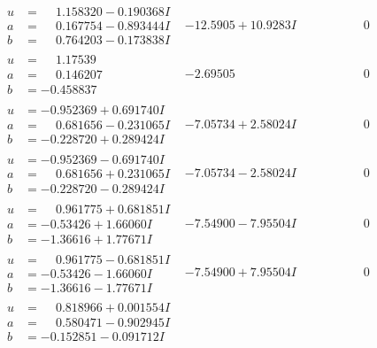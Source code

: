 \documentclass[1p]{elsarticle_modified}
\theoremstyle{definition}
\begin{document}
$$\begin{array}{c|c|c}
\begin{aligned}
u &= \phantom{-}1.158320 - 0.190368 I \\
a &= \phantom{-}0.167754 - 0.893444 I \\
b &= \phantom{-}0.764203 - 0.173838 I\end{aligned}
 & -12.5905 + 10.9283 I & \phantom{-0.000000 } 0 \\ \hline\begin{aligned}
u &= \phantom{-}1.17539\phantom{ +0.000000I} \\
a &= \phantom{-}0.146207\phantom{ +0.000000I} \\
b &= -0.458837\phantom{ +0.000000I}\end{aligned}
 & -2.69505\phantom{ +0.000000I} & \phantom{-0.000000 } 0 \\ \hline\begin{aligned}
u &= -0.952369 + 0.691740 I \\
a &= \phantom{-}0.681656 - 0.231065 I \\
b &= -0.228720 + 0.289424 I\end{aligned}
 & -7.05734 + 2.58024 I & \phantom{-0.000000 } 0 \\ \hline\begin{aligned}
u &= -0.952369 - 0.691740 I \\
a &= \phantom{-}0.681656 + 0.231065 I \\
b &= -0.228720 - 0.289424 I\end{aligned}
 & -7.05734 - 2.58024 I & \phantom{-0.000000 } 0 \\ \hline\begin{aligned}
u &= \phantom{-}0.961775 + 0.681851 I \\
a &= -0.53426 + 1.66060 I \\
b &= -1.36616 + 1.77671 I\end{aligned}
 & -7.54900 - 7.95504 I & \phantom{-0.000000 } 0 \\ \hline\begin{aligned}
u &= \phantom{-}0.961775 - 0.681851 I \\
a &= -0.53426 - 1.66060 I \\
b &= -1.36616 - 1.77671 I\end{aligned}
 & -7.54900 + 7.95504 I & \phantom{-0.000000 } 0 \\ \hline\begin{aligned}
u &= \phantom{-}0.818966 + 0.001554 I \\
a &= \phantom{-}0.580471 - 0.902945 I \\
b &= -0.152851 - 0.091712 I\end{aligned}

\end{array}$$
\end{document}
